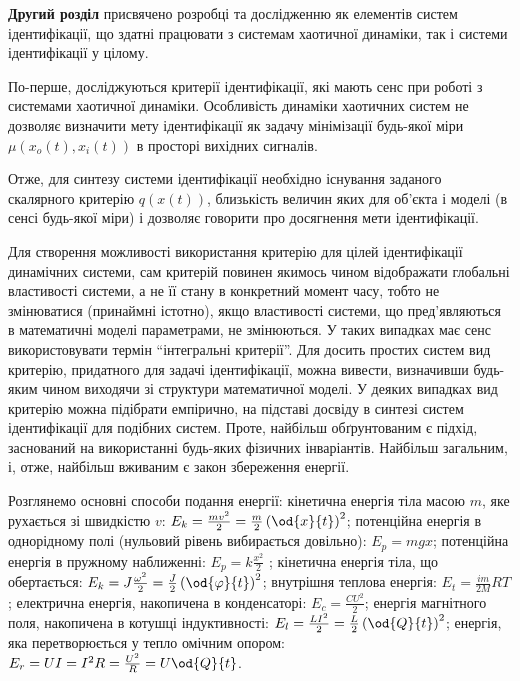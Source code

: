 \documentclass[a4paper,13pt]{atuaref}
\begin{document}
\textbf{Другий розділ}
присвячено розробці та дослідженню як елементів систем ідентифікації,
що здатні працювати з системам хаотичної динаміки, так і системи ідентифікації у цілому.

По-перше, досліджуються критерії ідентифікації,
які мають сенс при роботі з системами
хаотичної динаміки.
Особливість динаміки хаотичних систем не дозволяє визначити мету ідентифікації
як задачу мінімізації будь-якої міри
$ \mu (x_o (t), x_i (t)) $ в просторі
вихідних сигналів.%

Отже, для синтезу системи ідентифікації необхідно існування заданого скалярного
критерію $q(x(t)) $, близькість величин яких для об'єкта і моделі (в сенсі
будь-якої міри) і дозволяє говорити про досягнення мети ідентифікації.

Для створення можливості використання критерію для цілей ідентифікації
динамічних системи, сам критерій повинен якимось чином відображати глобальні
властивості системи, а не її стану в конкретний момент часу, тобто не
змінюватися (принаймні істотно), якщо властивості системи, що пред'являються в
математичні моделі параметрами, не змінюються. У таких випадках має сенс
використовувати термін ``інтегральні критерії''.
Для досить простих систем вид критерію, придатного для задачі ідентифікації,
можна вивести, визначивши будь-яким чином виходячи зі структури математичної
моделі. У деяких випадках вид критерію можна підібрати емпірично, на
підставі досвіду в синтезі систем ідентифікації для подібних систем. Проте,
найбільш обґрунтованим є підхід, заснований на використанні будь-яких фізичних
інваріантів.
Найбільш загальним, і, отже, найбільш вживаним є закон збереження енергії.

Розглянемо основні способи подання енергії:
кінетична енергія тіла масою $m$, яке рухається зі швидкістю $v$:
$  E_k = \frac{mv^2}{2} = \frac{m}{2} \left( \od{x}{t} \right)^2$;
потенційна енергія в однорідному полі (нульовий рівень вибирається довільно):
$  E_p = m g x $;
потенційна енергія в пружному наближенні:
$  E_p = k \frac{x^2}{2}$ ;
кінетична енергія тіла, що обертається:
$  E_k = J \frac{\omega^2}{2} = \frac{J}{2} \left( \od{\varphi}{t} \right)^2 $;
внутрішня теплова енергія:
$  E_t = \frac{im}{2M} RT$;
електрична енергія, накопичена в конденсаторі:
$  E_c = \frac{C U^2}{2}$;
енергія магнітного поля, накопичена в котушці індуктивності:
$  E_l = \frac{L I^2}{2} = \frac{L}{2} \left( \od{Q}{t}\right)^2 $;
енергія, яка перетворюється у тепло омічним опором:
$  E_r = U I = I^2 R = \frac{U^2}{R} = U \od{Q}{t} $.
\end{document}
